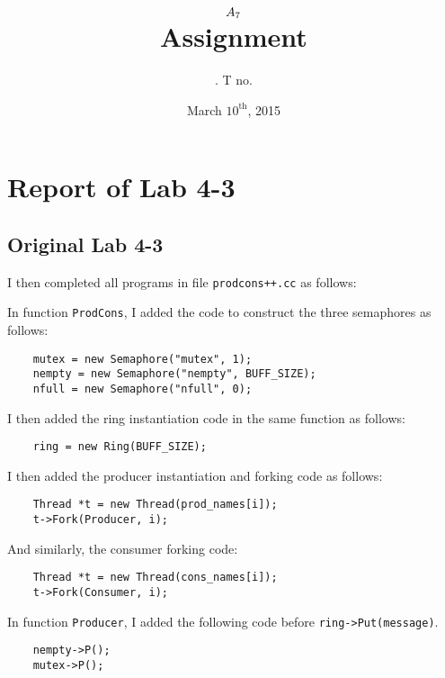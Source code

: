 \documentclass[11pt]{article}
\title{
    $A_{7}$ \\
    {\large Assignment \rom{\hw}}
}
\author{
    \name. T no. \tno
}
\date{March $10^{\text{th}}$, 2015}
\begin{document}
\maketitle

\section{Report of Lab 4-3}

    \subsection{Original Lab 4-3}

    \setcounter{qsection}{3}

    \begin{question}
        I then completed all programs in file {\tt prodcons++.cc} as follows:

        \begin{subquestion}
            In function {\tt ProdCons}, I added the code to construct the three semaphores as follows:
            \begin{verbatim}
    mutex = new Semaphore("mutex", 1);
    nempty = new Semaphore("nempty", BUFF_SIZE);
    nfull = new Semaphore("nfull", 0);
            \end{verbatim}

            I then added the ring instantiation code in the same function as follows:
            \begin{verbatim}
    ring = new Ring(BUFF_SIZE);
            \end{verbatim}

            I then added the producer instantiation and forking code as follows:
            \begin{verbatim}
    Thread *t = new Thread(prod_names[i]);
    t->Fork(Producer, i);
            \end{verbatim}

            And similarly, the consumer forking code:
            \begin{verbatim}
    Thread *t = new Thread(cons_names[i]);
    t->Fork(Consumer, i);
            \end{verbatim}

        \end{subquestion}
        \begin{subquestion}

            In function {\tt Producer}, I added the following code before {\tt ring->Put(message)}.
            \begin{verbatim}
    nempty->P();
    mutex->P();
            \end{verbatim}


\end{subquestion}
\end{question}
\end{document}
